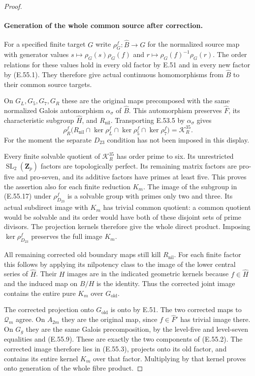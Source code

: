 \begin{proof}
\paragraph{Generation of the whole common source after correction.}
For a specified finite target $G$ write
$\rho_G^f:\widehat B\to G$ for the normalized
source map with generator values
$s\mapsto\rho_G(s)\rho_G(f)$ and
$r\mapsto\rho_G(f)^{-1}\rho_G(r)$.
The order relations for these values hold in
every old factor by E.51 and in every new
factor by \textup{(E.55.1)}.
They therefore give actual continuous
homomorphisms from $\widehat B$ to their
common source targets.

On $G_L,G_5,G_7,G_R$ these are the original
maps precomposed with the same normalized
Galois automorphism $\alpha_\sigma$ of
$\widehat B$. This automorphism preserves
$\widehat F$, its characteristic subgroup
$\widehat H$, and $R_{\mathrm{nil}}$.
Transporting E.53.5 by $\alpha_\sigma$ gives
\[
 \rho_R^f\bigl(R_{\mathrm{nil}}\cap\ker\rho_L^f
                \cap\ker\rho_5^f\cap\ker\rho_7^f\bigr)
                         =\mathcal K_R^{35}.
 \tag{E.55.17}
\]
For the moment the separate $D_{23}$ condition
has not been imposed in this display.

Every finite solvable quotient of
$\mathcal K_R^{35}$ has order prime to six.
Its unrestricted $\operatorname{SL}_2(\mathbf Z_p)$
factors are topologically perfect. Its remaining
matrix factors are pro-five and pro-seven, and
its additive factors have primes at least five.
This proves the assertion also for each finite
reduction $K_m$.
The image of the subgroup in
\textup{(E.55.17)} under $\rho_{D_{23}}^f$ is a
solvable group with primes only two and three.
Its actual subdirect image with $K_m$ has
trivial common quotient: a common quotient
would be solvable and its order would have
both of these disjoint sets of prime divisors.
The projection kernels therefore give the
whole direct product. Imposing
$\ker\rho_{D_{23}}^f$ preserves the full
image $K_m$.

All remaining corrected old boundary maps
still kill $R_{\mathrm{nil}}$.
For each finite factor this follows by
applying its nilpotency class to the image
of the lower central series of $\widehat H$.
Their $H$ images are in the indicated
geometric kernels because $f\in\widehat H$
and the induced map on $B/H$ is the
identity. Thus the corrected joint image
contains the entire pure $K_m$ over
$G_{\mathrm{old}}$.

The corrected projection onto
$G_{\mathrm{old}}$ is onto by E.51.
The two corrected maps to $\mathcal Q_m$
agree. On $A_{2m}$ they are the original
map, since $f\in\widehat F'$ has trivial
image there. On $G_g$ they are the same
Galois precomposition, by the level-five
and level-seven equalities and
\textup{(E.55.9)}. These are exactly the
two components of \textup{(E.55.2)}.
The corrected image therefore lies in
\textup{(E.55.3)}, projects onto its old
factor, and contains its entire kernel
$K_m$ over that factor. Multiplying by
that kernel proves onto generation of
the whole fibre product.


\end{proof}
